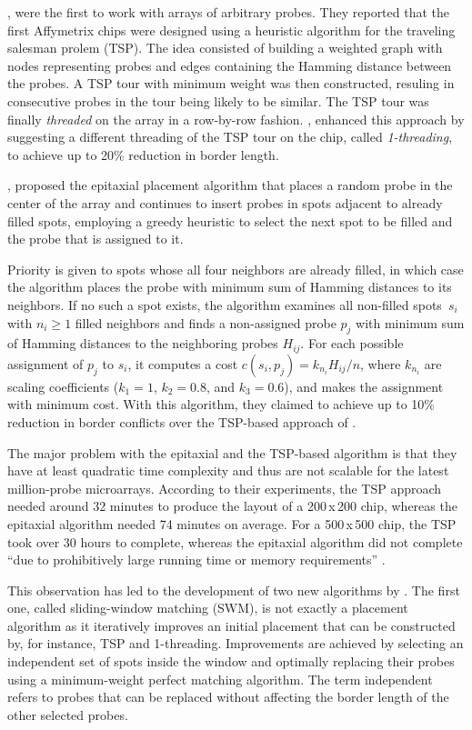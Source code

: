 \documentclass{bioinfo}
\begin{document}
\citealp{HANNENHALLI02}, were the first to work with arrays of arbitrary probes. They reported that the first Affymetrix chips were designed using a heuristic algorithm for the traveling salesman prolem (TSP). The idea consisted of building a weighted graph with nodes representing probes and edges containing the Hamming distance between the probes. A TSP tour with minimum weight was then constructed, resuling in consecutive probes in the tour being likely to be similar. The TSP tour was finally \emph{threaded} on the array in a row-by-row fashion. \citealp{HANNENHALLI02}, enhanced this approach by suggesting a different threading of the TSP tour on the chip, called \emph{1-threading}, to achieve up to 20\% reduction in border length.

\citealp{KAHNG02}, proposed the epitaxial placement algorithm that places a random probe in the center of the array and continues to insert probes in spots adjacent to already filled spots, employing a greedy heuristic to select the next spot to be filled and the probe that is assigned to it.

Priority is given to spots whose all four neighbors are already filled, in which case the algorithm places the probe with minimum sum of Hamming distances to its neighbors. If no such a spot exists, the algorithm examines all non-filled spots~$s_i$ with $n_i \geq 1$ filled neighbors and finds a non-assigned probe $p_j$ with minimum sum of Hamming distances to the neighboring probes $H_{ij}$. For each possible assignment of $p_j$ to $s_i$, it computes a cost $c(s_i,p_j) = k_{n_i} H_{ij} / n$, where $k_{n_i}$ are scaling coefficients ($k_1 = 1$, $k_2 = 0.8$, and $k_3 = 0.6$), and makes the assignment with minimum cost. With this algorithm, they claimed to achieve up to 10\% reduction in border conflicts over the TSP-based approach of \citealp{HANNENHALLI02}.

The major problem with the epitaxial and the TSP-based algorithm is that they have at least quadratic time complexity and thus are not scalable for the latest million-probe microarrays. According to their experiments, the TSP approach needed around 32 minutes to produce the layout of a 200\,x\,200 chip, whereas the epitaxial algorithm needed 74 minutes on average. For a 500\,x\,500 chip, the TSP took over 30 hours to complete, whereas the epitaxial algorithm did not complete ``due to prohibitively large running time or memory requirements'' \citep{KAHNG02}.

This observation has led to the development of two new algorithms by \citealp{KAHNG03A}. The first one, called sliding-window matching (SWM), is not exactly a placement algorithm as it iteratively improves an initial placement that can be constructed by, for instance, TSP and 1-threading. Improvements are achieved by selecting an independent set of spots inside the window and optimally replacing their probes using a minimum-weight perfect matching algorithm. The term independent refers to probes that can be replaced without affecting the border length of the other selected probes.
\end{document}
